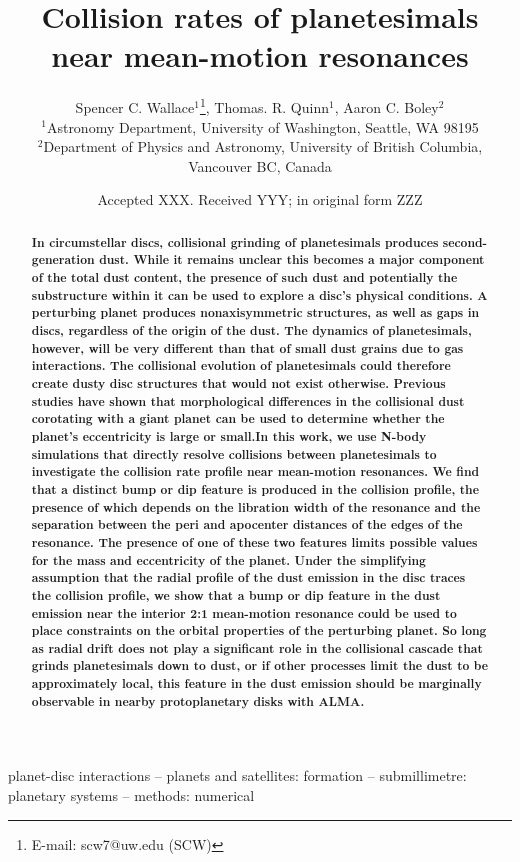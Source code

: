 \documentclass[fleqn,usenatbib]{mnras}
\title[Collision rates of planetesimals]{Collision rates of planetesimals near mean-motion resonances}
\author[S. C. Wallace et al.]{
Spencer C. Wallace$^{1}$\thanks{E-mail: scw7@uw.edu (SCW)},
Thomas. R. Quinn$^{1}$,
Aaron C. Boley$^{2}$
\\
$^{1}$Astronomy Department, University of Washington, Seattle, WA 98195\\
$^{2}$Department of Physics and Astronomy, University of British Columbia, Vancouver BC, Canada
}
\date{Accepted XXX. Received YYY; in original form ZZZ}
\begin{document}
\label{firstpage}
\pagerange{\pageref{firstpage}--\pageref{lastpage}}
\maketitle

\begin{abstract}
\textbf{In circumstellar discs, collisional grinding of planetesimals produces second-generation dust. While it remains unclear this becomes a major component of the total dust content, 
the presence of such dust and potentially the substructure within it can be used to explore a disc's physical conditions. A perturbing planet produces nonaxisymmetric structures, as
well as gaps in discs, regardless of the origin of the dust. The dynamics of planetesimals, however, will be very different than that of small dust grains due to gas interactions. The
collisional evolution of planetesimals could therefore create dusty disc structures that would not exist otherwise. Previous studies have shown that morphological differences in the
collisional dust corotating with a giant planet can be used to determine whether the planet's eccentricity is large or small.In this work, we use N-body simulations that directly resolve
collisions between planetesimals to investigate the collision rate profile near mean-motion resonances. We  find that a distinct bump or dip feature is produced in the collision profile,
the presence of which depends on the libration width of the resonance and the separation between the peri and apocenter distances of the edges of the resonance. The presence of
one of these two features limits possible values for the mass and eccentricity of the planet. Under the simplifying assumption that the radial profile of the dust emission in the disc
traces the collision profile, we show that a bump or dip feature in the dust emission near the interior 2:1 mean-motion resonance could be used to place constraints
on the orbital properties of the perturbing planet. So long as radial drift does not play a significant role in the collisional cascade that grinds planetesimals down to
dust, or if other processes limit the dust to be approximately local, this feature in the dust emission should be marginally observable in nearby protoplanetary disks with ALMA.}
\end{abstract}

\begin{keywords}
planet-disc interactions -- planets and satellites: formation -- submillimetre: planetary systems -- methods: numerical
\end{keywords}
\end{document}
